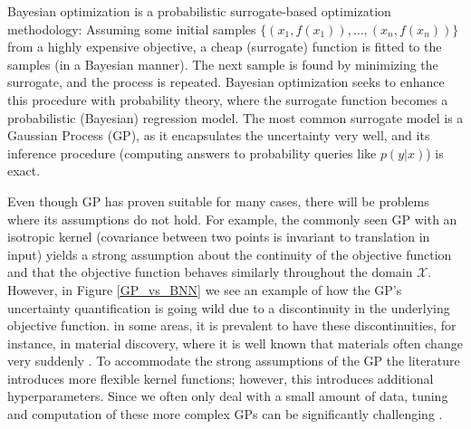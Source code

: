 Bayesian optimization is a probabilistic surrogate-based optimization methodology: Assuming some
initial samples $\{(x_1,f(x_1)), \dots, (x_n,f(x_n))\}$ from a highly expensive objective, a cheap
(surrogate) function is fitted to the samples (in a Bayesian manner). The next sample is found by
minimizing the surrogate, and the process is repeated. Bayesian optimization seeks to enhance this
procedure with probability theory, where the surrogate function becomes a probabilistic (Bayesian)
regression model. The most common surrogate model is a Gaussian Process (GP), as it encapsulates the
uncertainty very well, and its inference procedure (computing answers to probability queries like
$p(y|x)$) is exact.


Even though GP has proven suitable for many cases, there will be problems where its assumptions do
not hold. For example, the commonly seen GP with an isotropic kernel (covariance between two points
is invariant to translation in input) yields a strong assumption about the continuity of the
objective function and that the objective function behaves similarly throughout the domain
$\mathcal{X}$. However, in Figure \ref{GP_vs_BNN} we see an example of how the GP's uncertainty
quantification is going wild due to a discontinuity in the underlying objective function. in some
areas, it is prevalent to have these discontinuities, for instance, in material discovery, where it
is well known that materials often change very suddenly \cite{Nature_BO_paper}. To accommodate the
strong assumptions of the GP the literature introduces more flexible kernel functions; however, this
introduces additional hyperparameters. Since we often only deal with a small amount of data, tuning
and computation of these more complex GPs can be significantly challenging \cite{Nature_BO_paper}.

